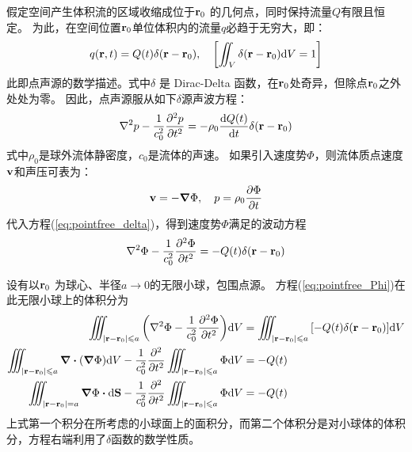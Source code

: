 \documentclass[UTF8]{ctexbook}
\begin{document}
假定空间产生体积流的区域收缩成位于$\vb{r}_0$ 的几何点，同时保持流量$Q$有限且恒定。
为此，在空间位置$\vb{r}_0$单位体积内的流量$q$必趋于无穷大，即：
$$q(\vb{r},t) = Q(t) \delta(\vb{r}-\vb{r}_0)\qc \qty[\iint_V \delta(\vb{r}-\vb{r}_0) \dd V = 1]$$
此即点声源的数学描述。式中$\delta$ 是 Dirac-Delta 函数，在$\vb{r}_0$处奇异，但除点$\vb{r}_0$之外处处为零。
因此，点声源服从如下$\delta$源声波方程：
\begin{equation}
	\laplacian p -\frac1{c_0^2} \pdv[2]{p}{t} = -\rho_0 \dv{Q(t)}{t} \delta (\vb{r}-\vb{r}_0)
	\label{eq:pointfree_delta}
\end{equation}
式中$\rho_0$是球外流体静密度，$c_0$是流体的声速。
如果引入速度势$\Phi$，则流体质点速度$\vb{v}$和声压可表为：
\begin{equation}
	\vb{v}=-\grad \Phi\qc p=\rho_0 \pdv{\Phi}{t}
	\label{}
\end{equation}
 代入方程(\ref{eq:pointfree_delta})，得到速度势$\Phi$满足的波动方程
 \begin{equation}
	 \laplacian \Phi -\frac{1}{c_0^2} \pdv[2]{\Phi}{t} = -Q(t) \delta(\vb{r}-\vb{r}_0)
	 \label{eq:pointfree_Phi}
 \end{equation}

 设有以$\vb{r}_0$ 为球心、半径$a\to 0$的无限小球，包围点源。
 方程(\ref{eq:pointfree_Phi})在此无限小球上的体积分为
\begin{align*}
	\iiint_{|\vb{r}-\vb{r}_0|\leq a}
	\qty(\laplacian \Phi - \frac{1}{c_0^2} \pdv[2]{\Phi}{t} ) \dd V 
	&=
	\iiint_{|\vb{r}-\vb{r}_0|\leq a}
	\qty[-Q(t)\delta(\vb{r}-\vb{r}_0)]\dd V\\
	\iiint_{|\vb{r}-\vb{r}_0|\leq a}
	\div\qty(\grad \Phi)\dd V-\frac{1}{c_0^2} \pdv[2]{t}
	\iiint_{|\vb{r}-\vb{r}_0|\leq a}
	\Phi \dd V&=-Q(t)\\
	\iiint_{|\vb{r}-\vb{r}_0|= a}
	\grad \Phi \vdot \dd \vb{S}
	-\frac{1}{c_0^2} \pdv[2]{t} 
	\iiint_{|\vb{r}-\vb{r}_0|\leq a}
	\Phi \dd V &=-Q(t)
\end{align*} 
 上式第一个积分在所考虑的小球面上的面积分，而第二个体积分是对小球体的体积分，方程右端利用了$\delta$函数的数学性质。
\end{document}
